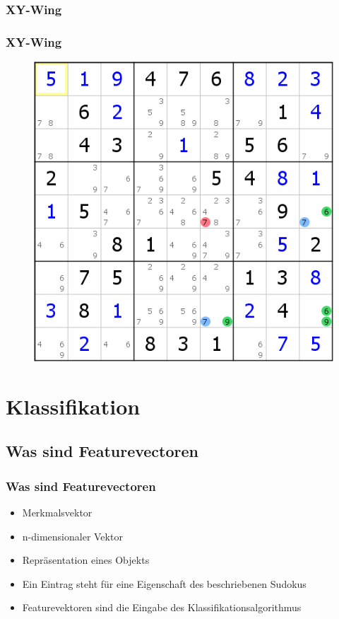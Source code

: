 \documentclass[accentcolor=tud6b,colorbacktitle,inverttitle,landscape,german,presentation,t]{tudbeamer}
\begin{document}
		\subsubsection{XY-Wing}
			\begin{frame}
			\frametitle{XY-Wing}
			\begin{figure}[Hh]
    			\includegraphics[width=\textwidth,height=\textheight-10pt,keepaspectratio]{./img/XY_Wing.png}
			\end{figure}
			\end{frame}

\section{Klassifikation}
	\subsection{Was sind Featurevectoren}
		\begin{frame}
		\frametitle{Was sind Featurevectoren}
		\begin{itemize}
		\item Merkmalsvektor
		\item n-dimensionaler Vektor
		\item Repräsentation eines Objekts
		\item Ein Eintrag steht für eine Eigenschaft des beschriebenen Sudokus
		\item Featurevektoren sind die Eingabe des Klassifikationsalgorithmus
		\end{itemize}
		\end{frame}
\end{document}
